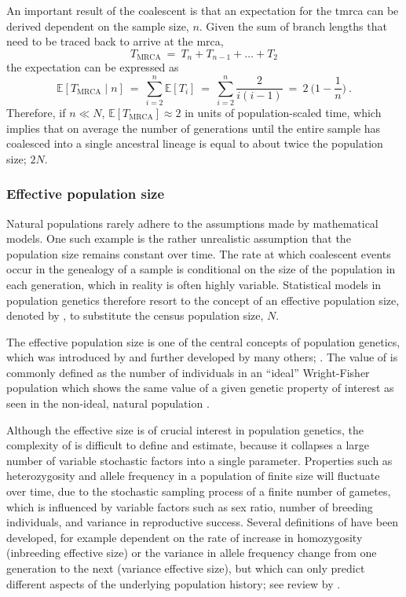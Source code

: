 An important result of the coalescent is that an expectation for the \gls{tmrca} can be derived dependent on the sample size, $n$.
Given the sum of branch lengths that need to be traced back to arrive at the \gls{mrca},
\begin{equation*}
	T_\text{MRCA} ~=~ T_n + T_{n-1} + \dots + T_2
\end{equation*}
the expectation can be expressed as
\begin{equation}\label{eq:coal_tmrca}
	\mathbb{E}[T_\text{MRCA} \mid n]
	~=~ \sum_{i = 2}^{n} \mathbb{E}[T_i]
	~=~ \sum_{i = 2}^{n} \frac{2}{i(i-1)}
	~=~ 2~\Big( 1 - \frac{1}{n} \Big)
	\ \text{.}
\end{equation}
Therefore, if ${n \ll N}$, ${\mathbb{E}[T_\text{MRCA}] \approx 2}$ in units of population-scaled time, which implies that on average the number of generations until the entire sample has coalesced into a single ancestral lineage is equal to about twice the population size; \ie $2N$.


%
\subsubsection{Effective population size}
\label{sec:effpopsize}
%

Natural populations rarely adhere to the assumptions made by mathematical models.
One such example is the rather unrealistic assumption that the population size remains constant over time.
The rate at which coalescent events occur in the genealogy of a sample is conditional on the size of the population in each generation, which in reality is often highly variable.
Statistical models in population genetics therefore resort to the concept of an effective population size, denoted by \Ne, to substitute the census population size, $N$.

The effective population size is one of the central concepts of population genetics, which was introduced by \citet{Wright1931} and further developed by many others; \eg \citet{crow1970introduction}.
The value of \Ne is commonly defined as the number of individuals in an ``ideal'' Wright-Fisher population \citep{Fisher1930,Wright1931} which shows the same value of a given genetic property of interest as seen in the non-ideal, natural population \citep{ewens2012}.

Although the effective size is of crucial interest in population genetics, the complexity of \Ne is difficult to define and estimate, because it collapses a large number of variable stochastic factors into a single parameter.
Properties such as heterozygosity and allele frequency in a population of finite size will fluctuate over time, due to the stochastic sampling process of a finite number of gametes, which is influenced by variable factors such as sex ratio, number of breeding individuals, and variance in reproductive success.
Several definitions of \Ne have been developed, for example dependent on the rate of increase in homozygosity (inbreeding effective size) or the variance in allele frequency change from one generation to the next (variance effective size), but which can only predict different aspects of the underlying population history; see review by \citet{Wang:2005wy}.

